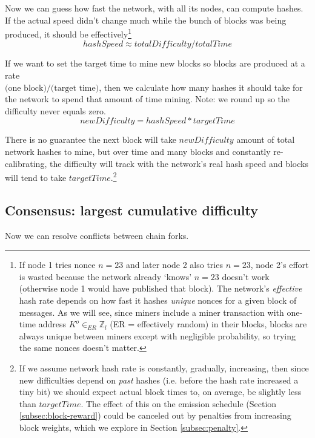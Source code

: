 Now we can guess how fast the network, with all its nodes, can compute hashes. If the actual speed didn't change much while the bunch of blocks was being produced, it should be effectively\footnote{If node 1 tries nonce $n = 23$ and later node 2 also tries $n = 23$, node 2's effort is wasted because the network already `knows' $n = 23$ doesn't work (otherwise node 1 would have published that block). The network's {\em effective} hash rate depends on how fast it hashes {\em unique} nonces for a given block of messages. As we will see, since miners include a miner transaction with one-time address $K^o \in_{ER} \mathbb{Z}_l$ (ER = effectively random) in their blocks, blocks are always unique between miners except with negligible probability, so trying the same nonces doesn't matter.}%
\[\mathit{hashSpeed} \approx \mathit{totalDifficulty}/\mathit{totalTime}\]

If we want to set the target time to mine new blocks so blocks are produced at a rate\\ \(\textrm{(one block)/(target time)}\), then we calculate how many hashes it should take for the network to spend that amount of time mining. Note: we round up so the difficulty never equals zero.%
\[\mathit{newDifficulty} = \mathit{hashSpeed}*\mathit{targetTime}\]

There is no guarantee the next block will take $\mathit{newDifficulty}$ amount of total network hashes to mine, but over time and many blocks and constantly re-calibrating, the difficulty will track with the network's real hash speed and blocks will tend to take $\mathit{targetTime}$.\footnote{If we assume network hash rate is constantly, gradually, increasing, then since new difficulties depend on {\em past} hashes (i.e. before the hash rate increased a tiny bit) we should expect actual block times to, on average, be slightly less than $\mathit{targetTime}$. The effect of this on the emission schedule (Section \ref{subsec:block-reward}) could be canceled out by penalties from increasing block weights, which we explore in Section \ref{subsec:penalty}.}


\subsection{Consensus: largest cumulative difficulty}

Now we can resolve conflicts between chain forks.

